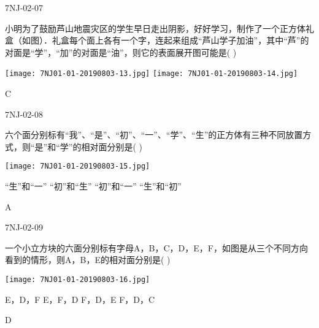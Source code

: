 \begin{defproblem}{7NJ-02-07}%
\begin{onlyproblem}%
小明为了鼓励芦山地震灾区的学生早日走出阴影，好好学习，制作了一个正方体礼盒（如图）．礼盒每个面上各有一个字，连起来组成“芦山学子加油”，其中“芦”的对面是“学”，“加”的对面是“油”，则它的表面展开图可能是(    ) 
\begin{center}
\texttt{[image: 7NJ01-01-20190803-13.jpg]}
\texttt{[image: 7NJ01-01-20190803-14.jpg]}
\end{center}


\end{onlyproblem}%
\begin{onlysolution}%
\begin{solution}%
C
\end{solution}%
\end{onlysolution}%
\end{defproblem}




\begin{defproblem}{7NJ-02-08}%
\begin{onlyproblem}%
六个面分别标有“我”、“是”、“初”、“一”、“学”、“生”的正方体有三种不同放置方式，则“是”和“学”的相对面分别是(    ) 
\begin{center}
\texttt{[image: 7NJ01-01-20190803-15.jpg]}
\end{center}

\xx
{“生”和“一”}
{“初”和“生”}
{“初”和“一”}
{“生”和“初”}   


\end{onlyproblem}%
\begin{onlysolution}%
\begin{solution}%
A
\end{solution}%
\end{onlysolution}%
\end{defproblem}



\begin{defproblem}{7NJ-02-09}%
\begin{onlyproblem}%
一个小立方块的六面分别标有字母A，B，C，D，E，F，如图是从三个不同方向看到的情形，则A，B，E的相对面分别是(    ) 
\begin{center}
\texttt{[image: 7NJ01-01-20190803-16.jpg]}
\end{center}

\xx
{E，D，F}
{E，F，D}
{F，D，E}
{F，D，C}


\end{onlyproblem}%
\begin{onlysolution}%
\begin{solution}%
D
\end{solution}%
\end{onlysolution}%
\end{defproblem}




